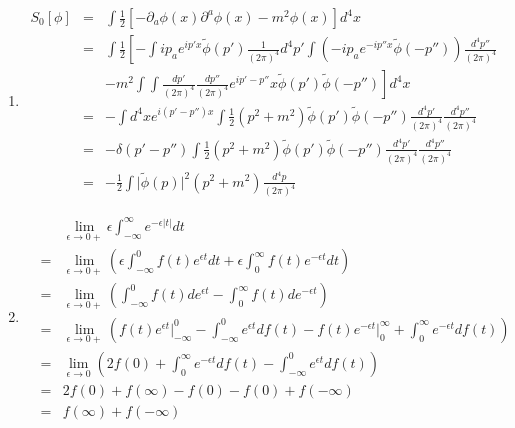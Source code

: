 \documentclass[12pt,a4paper]{article}
\begin{document}
\begin{enumerate}
\item

\begin{eqnarray*}
	S_0[\phi] &=& \int \frac12 [ -\partial_a \phi(x)\partial^a \phi(x) -m^2 \phi(x)]  d ^4x \\
	&=& \int \frac12 \left[ -\int ip_a e^{ip' x}\tilde \phi(p')\frac{1}{(2\pi)^4} d ^4p' \int\left(-ip_a e^{-ip'' x} \tilde \phi(-p'')\right) \frac{ d ^4p''}{(2\pi)^4}\right. \\
	&& \left. - m^2\int\int \frac{ d p'}{(2\pi)^4} \frac{ d p''}{(2\pi)^4} e^{ip'-p''}x\tilde \phi(p')\tilde\phi(-p'')  \right] d ^4 x \\
	&=& - \int  d ^4 x e^{i(p'-p'')x}\int\frac12 (p^2 + m^2)\tilde \phi (p')\tilde\phi(-p'')  \frac{ d ^4 p'}{(2\pi)^4}\frac{ d ^4p''}{(2\pi)^4} \\
	&=& - \delta(p'-p'')\int \frac12 (p^2 + m^2) \tilde\phi(p')\tilde\phi(-p'') \frac{ d ^4 p'}{(2\pi)^4}\frac{ d ^4p''}{(2\pi)^4} \\
	&=& -\frac12 \int\vert \tilde\phi(p)\vert^2 (p^2 + m^2) \frac{ d ^4 p}{(2\pi)^4}
\end{eqnarray*}



\item

\begin{eqnarray*}
	&&\lim_{\epsilon\rightarrow 0+}\epsilon \int_{-\infty}^{\infty}e^{-\epsilon\vert t \vert}  dt \\
	&=&\lim_{\epsilon \rightarrow 0+} \left(  \epsilon \int_{-\infty}^0 f(t)e^{\epsilon t} dt + \epsilon \int_0^\infty f(t)e^{-\epsilon t} dt \right) \\
	&=& \lim_{\epsilon \rightarrow 0+} \left( \int_{-\infty}^0 f(t) de^{\epsilon t} - \int_0^\infty f(t) de^{-\epsilon t} \right) \\
	&=& \lim_{\epsilon \rightarrow 0+}  \left( f(t)e^{\epsilon t}\vert_{-\infty}^0 - \int_{-\infty}^0 e^{\epsilon t} df(t) - f(t)e^{-\epsilon t}\vert_0^{\infty} + \int_0^\infty e^{-\epsilon t}df(t)    \right) \\
	&=& \lim_{\epsilon\rightarrow 0} \left(  2f(0) + \int_0^\infty e^{-\epsilon t} d f(t) - \int_{-\infty}^0 e^{\epsilon t} d f(t)  \right) \\
	&=& 2f(0) + f(\infty) - f(0) - f(0) + f(-\infty) \\
	&=& f(\infty) + f(-\infty)
\end{eqnarray*}








\end{enumerate}
\end{document}
